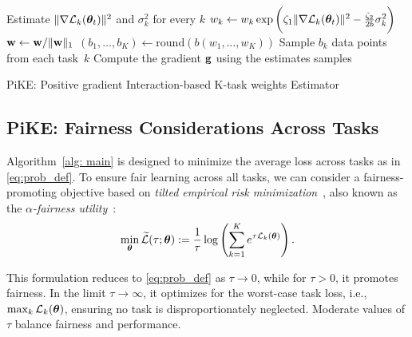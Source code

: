\begin{algorithm}[!tb] 
    \begin{algorithmic}[1]
                    \STATE Estimate $\|\nabla \mathcal{L}_k(\bm{\theta}_t)\|^2$ and $\sigma_k^2$ for every $k$
                    \STATE $w_k \gets w_k \exp\bigg(\zeta_1  \|\nabla \mathcal{L}_k(\bm{\theta}_t)\|^2 - \frac{\zeta_2}{2b} \sigma_k^2 \bigg)$
                    \STATE  $\mathbf{w} \gets \mathbf{w} /\|\mathbf{w}\|_1$
                    \STATE $(b_1,\ldots, b_K) \gets \textrm{round}(b (w_1,\ldots, w_K))$
                \ENDIF
		        \STATE Sample $b_k$ data points from each task~$k$
                \STATE Compute the gradient $\mathbf{g}$ using the estimates samples
		\ENDFOR
    \end{algorithmic}
    \caption{PiKE: Positive gradient Interaction-based K-task weights Estimator}
    \label{alg: main}
\end{algorithm}


\subsection{PiKE: Fairness Considerations Across Tasks}  
Algorithm~\ref{alg: main} is designed to minimize the average loss across tasks as in \eqref{eq:prob_def}. To ensure fair learning across all tasks, we can consider a fairness-promoting objective based on \textit{tilted empirical risk minimization}~\citep{li2020tilted}, also known as the $\alpha$\textit{-fairness utility}~\citep{mo2000fair}:  
\begin{equation}\label{eq:fairness_def}  
   \min_{\bm{\theta}} \widetilde{\mathcal{L}}(\tau ; \bm{\theta}) := \frac{1}{\tau} \log \left(\sum^K_{k=1} e^{\tau\mathcal{L}_k(\bm{\theta})}\right).
\end{equation}  
\vspace{-0.2cm}

This formulation reduces to \eqref{eq:prob_def} as \(\tau \to 0\), while for \(\tau > 0\), it promotes fairness. In the limit \(\tau \to \infty\), it optimizes for the worst-case task loss, i.e., \(\max_k \mathcal{L}_k(\bm{\theta})\), ensuring no task is disproportionately neglected. Moderate values of \(\tau\) balance fairness and performance.  

